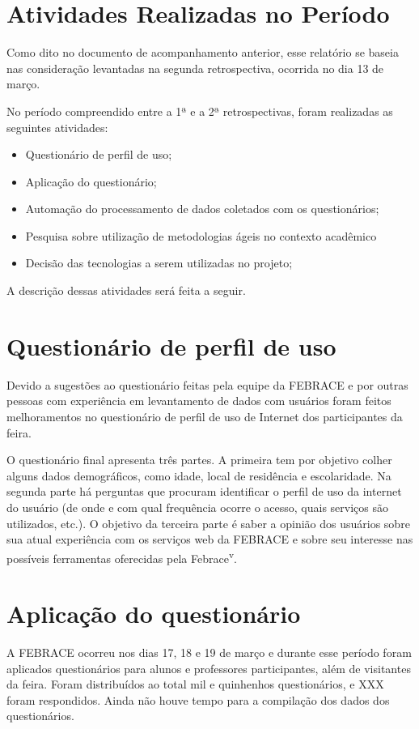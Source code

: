 \documentclass[a4paper,12pt,font=plain,header=plain]{abnt}
\begin{document}
  \section{Atividades Realizadas no Período}
    Como dito no documento de acompanhamento anterior, esse relatório se baseia nas consideração levantadas na segunda retrospectiva, ocorrida no dia 13 de março.

    No período compreendido entre a 1ª e a 2ª retrospectivas, foram realizadas as seguintes atividades:
    \begin{itemize}
      \item
        Questionário de perfil de uso;
      \item
        Aplicação do questionário;
      \item
        Automação do processamento de dados coletados com os questionários;
      \item
        Pesquisa sobre utilização de metodologias ágeis no contexto acadêmico
      \item
        Decisão das tecnologias a serem utilizadas no projeto;
    \end{itemize}

    A descrição dessas atividades será feita a seguir.

  \section{Questionário de perfil de uso}
    Devido a sugestões ao questionário feitas pela equipe da FEBRACE e por outras pessoas com experiência em levantamento de dados com usuários foram feitos melhoramentos no questionário de perfil de uso de Internet dos participantes da feira.

    O questionário final apresenta três partes. A primeira tem por objetivo colher alguns dados demográficos, como idade, local de residência e escolaridade. Na segunda parte há perguntas que procuram identificar o perfil de uso da internet do usuário (de onde e com qual frequência ocorre o acesso, quais serviços são utilizados, etc.). O objetivo da terceira parte é saber a opinião dos usuários sobre sua atual experiência com os serviços web da FEBRACE e sobre seu interesse nas possíveis ferramentas oferecidas pela Febrace\textsuperscript{v}.

  \section{Aplicação do questionário}
    A FEBRACE ocorreu nos dias 17, 18 e 19 de março e durante esse período foram aplicados questionários para alunos e professores participantes, além de visitantes da feira. Foram distribuídos ao total mil e quinhenhos questionários, e XXX foram respondidos. Ainda não houve tempo para a compilação dos dados dos questionários.
\end{document}
